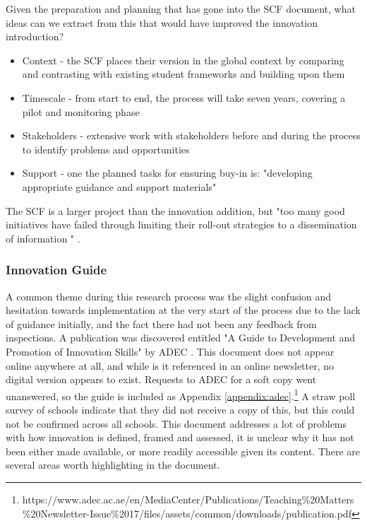 \documentclass[11pt]{article}
\begin{document}
Given the preparation and planning that has gone into the SCF document, what ideas can we extract from this that would have improved the innovation introduction?

\begin{itemize}
	\item Context - the SCF places their version in the global context by comparing and contrasting with existing student frameworks and building upon them
	\item Timescale - from start to end, the process will take seven years, covering a pilot and monitoring phase
	\item Stakeholders - extensive work with stakeholders before and during the process to identify problems and opportunities
	\item Support - one the planned tasks for ensuring buy-in is: "developing appropriate guidance and support materials"
\end{itemize}

The SCF is a larger project than the innovation addition, but "too many good initiatives have failed through limiting their roll-out strategies to a dissemination of information \citep{Cordingley2007}" \citep{ADEC2016}.

\subsubsection{Innovation Guide}
A common theme during this research process was the slight confusion and hesitation towards implementation at the very start of the process due to the lack of guidance initially, and the fact there had not been any feedback from inspections. A publication was discovered entitled "A Guide to Development and Promotion of Innovation Skills" by ADEC \citet{ADEC2015a}. This document does not appear online anywhere  at all, and while is it referenced in an online newsletter, no digital version appears to exist. Requests to ADEC for a soft copy went unanswered, so the guide is included as Appendix \ref{appendix:adec}.\footnote{https://www.adec.ac.ae/en/MediaCenter/Publications/Teaching\%20Matters\%20Newsletter-Issue\%2017/files/assets/common/downloads/publication.pdf} A straw poll survey of schools indicate that they did not receive a copy of this, but this could not be confirmed across all schools. This document addresses a lot of problems with how innovation is defined, framed and assessed, it is unclear why it has not been either made available, or more readily accessible given its content. There are several areas worth highlighting in the document.
\end{document}
